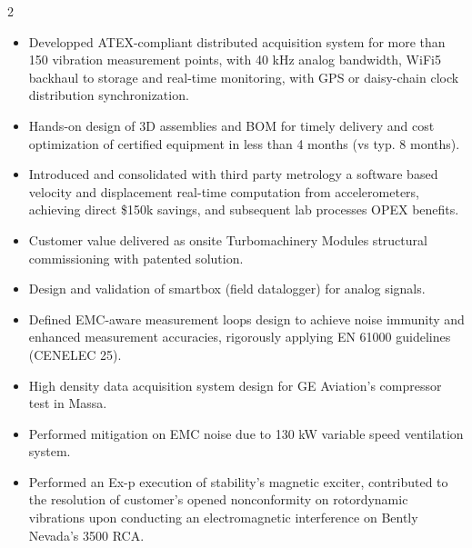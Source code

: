 \documentclass[9pt,a4paper,ragged2e,withhyper]{altacv} %
\begin{document}
\begin{paracol}{2}
\begin{itemize}
\item Developped ATEX-compliant distributed acquisition system for more than 150 vibration measurement points, with 40 kHz analog bandwidth, WiFi5 backhaul to storage and real-time monitoring, with GPS or daisy-chain clock distribution synchronization.
\item Hands-on design of 3D assemblies and BOM for timely delivery and cost optimization of certified equipment in less than 4 months (vs typ. 8 months).
\item Introduced and consolidated with third party metrology a software based velocity and displacement real-time computation from accelerometers, achieving direct \$150k savings, and subsequent lab processes OPEX benefits.
\item Customer value delivered as onsite Turbomachinery Modules structural commissioning with patented solution.
\end{itemize}
\divider

\begin{itemize}
\item Design and validation of smartbox (field datalogger) for analog signals.
\item Defined EMC-aware measurement loops design to achieve noise immunity and enhanced measurement accuracies, rigorously applying EN 61000 guidelines (CENELEC 25).
\end{itemize}
\divider

\begin{itemize}
\item High density data acquisition system design for GE Aviation’s compressor test in Massa.
\item Performed mitigation on EMC noise due to 130 kW variable speed ventilation system.
\end{itemize}
\divider

\begin{itemize}
\item Performed an Ex-p execution of stability’s magnetic exciter, contributed to the resolution of customer’s opened nonconformity on rotordynamic vibrations upon conducting an electromagnetic interference on Bently Nevada's 3500 RCA.
\end{itemize}
\divider


\end{paracol}
\end{document}
